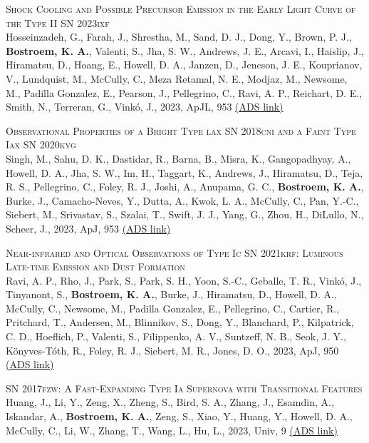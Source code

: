\begin{revnumerate}[67]
\item{\textsc{Shock Cooling and Possible Precursor Emission in the Early Light Curve of the Type II SN 2023ixf}\\ 
Hosseinzadeh, G., Farah, J., Shrestha, M., Sand, D. J., Dong, Y., Brown, P. J., \textbf{Bostroem, K. A.}, Valenti, S., Jha, S. W., Andrews, J. E., Arcavi, I., Haislip, J., Hiramatsu, D., Hoang, E., Howell, D. A., Janzen, D., Jencson, J. E., Kouprianov, V., Lundquist, M., McCully, C., Meza Retamal, N. E., Modjaz, M., Newsome, M., Padilla Gonzalez, E., Pearson, J., Pellegrino, C., Ravi, A. P., Reichart, D. E., Smith, N., Terreran, G., Vinkó, J., 2023, ApJL, 953 
\color{blue}\href{https://ui.adsabs.harvard.edu/abs/2023ApJ...953L..16H}{(ADS link)}\color{black}}\\

\item{\textsc{Observational Properties of a Bright Type lax SN 2018cni and a Faint Type Iax SN 2020kyg}\\ 
Singh, M., Sahu, D. K., Dastidar, R., Barna, B., Misra, K., Gangopadhyay, A., Howell, D. A., Jha, S. W., Im, H., Taggart, K., Andrews, J., Hiramatsu, D., Teja, R. S., Pellegrino, C., Foley, R. J., Joshi, A., Anupama, G. C., \textbf{Bostroem, K. A.}, Burke, J., Camacho-Neves, Y., Dutta, A., Kwok, L. A., McCully, C., Pan, Y.-C., Siebert, M., Srivastav, S., Szalai, T., Swift, J. J., Yang, G., Zhou, H., DiLullo, N., Scheer, J., 2023, ApJ, 953 
\color{blue}\href{https://ui.adsabs.harvard.edu/abs/2023ApJ...953...93S}{(ADS link)}\color{black}}\\

\item{\textsc{Near-infrared and Optical Observations of Type Ic SN 2021krf: Luminous Late-time Emission and Dust Formation}\\ 
Ravi, A. P., Rho, J., Park, S., Park, S. H., Yoon, S.-C., Geballe, T. R., Vinkó, J., Tinyanont, S., \textbf{Bostroem, K. A.}, Burke, J., Hiramatsu, D., Howell, D. A., McCully, C., Newsome, M., Padilla Gonzalez, E., Pellegrino, C., Cartier, R., Pritchard, T., Andersen, M., Blinnikov, S., Dong, Y., Blanchard, P., Kilpatrick, C. D., Hoeflich, P., Valenti, S., Filippenko, A. V., Suntzeff, N. B., Seok, J. Y., Könyves-Tóth, R., Foley, R. J., Siebert, M. R., Jones, D. O., 2023, ApJ, 950 
\color{blue}\href{https://ui.adsabs.harvard.edu/abs/2023ApJ...950...14R}{(ADS link)}\color{black}}\\

\item{\textsc{SN 2017fzw: A Fast-Expanding Type Ia Supernova with Transitional Features}\\ 
Huang, J., Li, Y., Zeng, X., Zheng, S., Bird, S. A., Zhang, J., Esamdin, A., Iskandar, A., \textbf{Bostroem, K. A.}, Zeng, S., Xiao, Y., Huang, Y., Howell, D. A., McCully, C., Li, W., Zhang, T., Wang, L., Hu, L., 2023, Univ, 9 
\color{blue}\href{https://ui.adsabs.harvard.edu/abs/2023Univ....9..295H}{(ADS link)}\color{black}}\\


\end{revnumerate}
